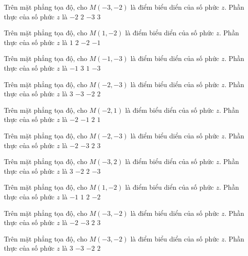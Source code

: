 \begin{ex}
 Trên mặt phẳng tọa độ, cho $M(-3,-2)$ là điểm biểu diển của số phức $z$. Phần thực của số phức $z$ là
\choice
{$-2$}
{$2$}
{\True $-3$}
{$3$}
\end{ex}
\begin{ex}
 Trên mặt phẳng tọa độ, cho $M(1,-2)$ là điểm biểu diển của số phức $z$. Phần thực của số phức $z$ là
\choice
{\True $1$}
{$2$}
{$-2$}
{$-1$}
\end{ex}
\begin{ex}
 Trên mặt phẳng tọa độ, cho $M(-1,-3)$ là điểm biểu diển của số phức $z$. Phần thực của số phức $z$ là
\choice
{\True $-1$}
{$3$}
{$1$}
{$-3$}
\end{ex}
\begin{ex}
 Trên mặt phẳng tọa độ, cho $M(-2,-3)$ là điểm biểu diển của số phức $z$. Phần thực của số phức $z$ là
\choice
{$3$}
{$-3$}
{\True $-2$}
{$2$}
\end{ex}
\begin{ex}
 Trên mặt phẳng tọa độ, cho $M(-2,1)$ là điểm biểu diển của số phức $z$. Phần thực của số phức $z$ là
\choice
{\True $-2$}
{$-1$}
{$2$}
{$1$}
\end{ex}
\begin{ex}
 Trên mặt phẳng tọa độ, cho $M(-2,-3)$ là điểm biểu diển của số phức $z$. Phần thực của số phức $z$ là
\choice
{\True $-2$}
{$-3$}
{$2$}
{$3$}
\end{ex}
\begin{ex}
 Trên mặt phẳng tọa độ, cho $M(-3,2)$ là điểm biểu diển của số phức $z$. Phần thực của số phức $z$ là
\choice
{$3$}
{$-2$}
{$2$}
{\True $-3$}
\end{ex}
\begin{ex}
 Trên mặt phẳng tọa độ, cho $M(1,-2)$ là điểm biểu diển của số phức $z$. Phần thực của số phức $z$ là
\choice
{$-1$}
{\True $1$}
{$2$}
{$-2$}
\end{ex}
\begin{ex}
 Trên mặt phẳng tọa độ, cho $M(-3,-2)$ là điểm biểu diển của số phức $z$. Phần thực của số phức $z$ là
\choice
{$-2$}
{\True $-3$}
{$2$}
{$3$}
\end{ex}
\begin{ex}
 Trên mặt phẳng tọa độ, cho $M(-3,-2)$ là điểm biểu diển của số phức $z$. Phần thực của số phức $z$ là
\choice
{$3$}
{\True $-3$}
{$-2$}
{$2$}
\end{ex}

